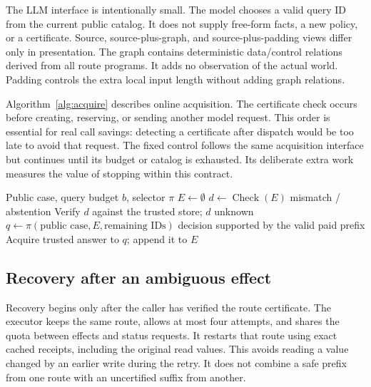 \documentclass[conference]{IEEEtran}
\begin{document}
The LLM interface is intentionally small. The model chooses a valid query ID from the current public catalog. It does not supply free-form facts, a new policy, or a certificate. Source, source-plus-graph, and source-plus-padding views differ only in presentation. The graph contains deterministic data/control relations derived from all route programs. It adds no observation of the actual world. Padding controls the extra local input length without adding graph relations.

Algorithm~\ref{alg:acquire} describes online acquisition. The certificate check occurs before creating, reserving, or sending another model request. This order is essential for real call savings: detecting a certificate after dispatch would be too late to avoid that request. The fixed control follows the same acquisition interface but continues until its budget or catalog is exhausted. Its deliberate extra work measures the value of stopping within this contract.

\begin{algorithm}[t]
\caption{Evidence acquisition with certificate stopping}
\label{alg:acquire}
\begin{algorithmic}[1]
\Require Public case, query budget $b$, selector $\pi$
\State $E\gets\emptyset$
  \State $d\gets\operatorname{Check}(E)$
    \State \Return mismatch / abstention
  \EndIf
    \State Verify $d$ against the trusted store; \Return $d$
  \EndIf
    \State \Return unknown
  \EndIf
  \State $q\gets\pi(\text{public case},E,\text{remaining IDs})$
    \State \Return decision supported by the valid paid prefix
  \EndIf
  \State Acquire trusted answer to $q$; append it to $E$
\EndFor
\end{algorithmic}
\end{algorithm}

\subsection{Recovery after an ambiguous effect}
Recovery begins only after the caller has verified the route certificate. The executor keeps the same route, allows at most four attempts, and shares the quota between effects and status requests. It restarts that route using exact cached receipts, including the original read values. This avoids reading a value changed by an earlier write during the retry. It does not combine a safe prefix from one route with an uncertified suffix from another.
\end{document}
